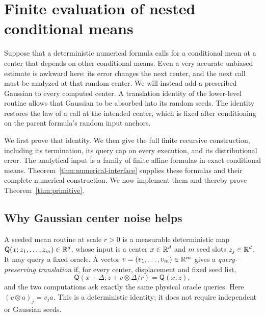 \section{Finite evaluation of nested conditional means}\label{sec:compiler}

Suppose that a deterministic numerical formula calls for a conditional
mean at a center that depends on other conditional means.  Even a very
accurate unbiased estimate is awkward here: its error changes the next
center, and the next call must be analyzed at that random center.  We
will instead add a prescribed Gaussian to every computed center.  A
translation identity of the lower-level routine allows that Gaussian to
be absorbed into its random seeds.  The identity restores the law of a
call at the intended center, which is fixed after conditioning on the
parent formula's random input anchors.

We first prove that identity.  We then give the full finite recursive
construction, including its termination, its query cap on every
execution, and its distributional error.  The analytical input is a
family of finite affine formulas in exact conditional means.  Theorem~\ref{thm:numerical-interface} supplies these formulas and their
complete numerical construction.  We now implement them and thereby
prove Theorem~\ref{thm:primitive}.

\subsection{Why Gaussian center noise helps}

A seeded mean routine at scale $r>0$ is a measurable deterministic map
$\mathsf Q(x;z_1,\ldots,z_m)\in\mathbb R^d$, whose input is a center
$x\in\mathbb R^d$ and $m$ seed slots $z_j\in\mathbb R^d$.  It may query a fixed
oracle.  A vector $v=(v_1,\ldots,v_m)\in\mathbb R^m$ gives a
\emph{query-preserving translation} if, for every center, displacement
and fixed seed list,
\begin{equation}\label{eq:mean-shift-warmup}
 \mathsf Q(x+\Delta;z+v\otimes\Delta/r)=\mathsf Q(x;z),
\end{equation}
and the two computations ask exactly the same physical oracle queries.
Here $(v\otimes a)_j=v_ja$.  This is a deterministic identity; it does
not require independent or Gaussian seeds.

